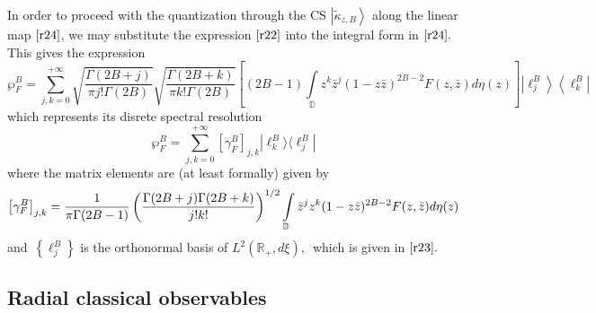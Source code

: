 In order to proceed with the quantization through the CS $\left\vert 
\widetilde{\kappa }_{z,B}\right\rangle $ along the linear map $\eqref{r24} $, we may substitute the expression $\eqref{r22}$ into
the integral form in $\eqref{r24} .$ This gives the expression%
\begin{equation}
\label{r25}
\wp _{F}^{B}=\sum_{j,k=0}^{+\infty }\sqrt{\frac{\Gamma (2B+j)}{\pi j!\Gamma
(2B)}}\sqrt{\frac{\Gamma (2B+k)}{\pi k!\Gamma (2B)}}\left[
(2B-1)\int\limits_{\mathbb{D}}z^{k}\bar{z}^{j}(1-z\bar{z})^{2B-2}F(z,\bar{z}%
)d\eta (z)\right] \left\vert \ell _{j}^{B}\right\rangle \left\langle \ell
_{k}^{B}\right\vert  
\end{equation}
which represents its disrete spectral resolution\textit{\ }%
\begin{equation}
\label{r26}
\wp _{F}^{B}=\sum_{j,k=0}^{+\infty }\left[ \gamma _{F}^{B}\right]
_{j,k}\left\vert \ell _{k}^{B}\rangle \langle \ell _{j}^{B}\right\vert 
\end{equation}
where the matrix elements are (at least formally) given by\textit{\ }%
\begin{equation}
\label{r27}
\left[ \gamma _{F}^{B}\right] _{j,k}=\frac{1}{\pi \Gamma (2B-1)}\left( \frac{%
\Gamma (2B+j)\Gamma (2B+k)}{j!k!}\right) ^{1/2}\int\limits_{\mathbb{D}}\bar{z%
}^{j}z^{k}(1-z\bar{z})^{2B-2}F(z,\bar{z})d\eta (z)  
\end{equation}
and\ $\left\{ \ell _{j}^{B}\right\} $ is the orthonormal basis of $L^{2}(%
\mathbb{R}_{+},d\xi ),$\ which is given in $\eqref{r23}.$




























\subsection{Radial classical observables}

